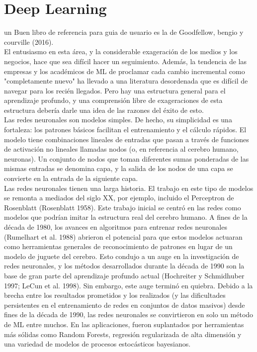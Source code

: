 \section{Deep Learning}
un Buen libro de referencia para guia de usuario es la de Goodfellow, bengio y courville (2016).\\
El entusiasmo en esta área, y la considerable exageración de los medios y los negocios, hace que sea difícil hacer un seguimiento. Además, la tendencia de las empresas y los académicos de ML de proclamar cada cambio incremental como "completamente nuevo" ha llevado a una literatura desordenada que es difícil de navegar para los recién llegados. Pero hay una estructura general para el aprendizaje profundo, y una comprensión libre de exageraciones de esta estructura debería darle una idea de las razones del éxito de esto.\\
Las redes neuronales son modelos simples. De hecho, su simplicidad es una fortaleza: los patrones básicos facilitan el entrenamiento y el cálculo rápidos. El modelo tiene combinaciones lineales de entradas que pasan a través de funciones de activación no lineales llamadas nodos (o, en referencia al cerebro humano, neuronas). Un conjunto de nodos que toman diferentes sumas ponderadas de las mismas entradas se denomina capa, y la salida de los nodos de una capa se convierte en la entrada de la siguiente capa.\\
Las redes neuronales tienen una larga historia. El trabajo en este tipo de modelos se remonta a mediados del siglo XX, por ejemplo, incluido el Perceptron de Rosenblatt (Rosenblatt 1958). Este trabajo inicial se centró en las redes como modelos que podrían imitar la estructura real del cerebro humano. A fines de la década de 1980, los avances en algoritmos para entrenar redes neuronales (Rumelhart et al. 1988) abrieron el potencial para que estos modelos actuaran como herramientas generales de reconocimiento de patrones en lugar de un modelo de juguete del cerebro. Esto condujo a un auge en la investigación de redes neuronales, y los métodos desarrollados durante la década de 1990 son la base de gran parte del aprendizaje profundo actual (Hochreiter y Schmidhuber 1997; LeCun et al. 1998). Sin embargo, este auge terminó en quiebra. Debido a la brecha entre los resultados prometidos y los realizados (y las dificultades persistentes en el entrenamiento de redes en conjuntos de datos masivos) desde fines de la década de 1990, las redes neuronales se convirtieron en solo un método de ML entre muchos. En las aplicaciones, fueron suplantados por herramientas más sólidas como Random Forests, regresión regularizada de alta dimensión y una variedad de modelos de procesos estocásticos bayesianos.\\
